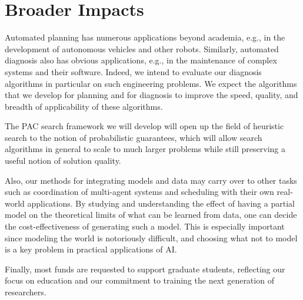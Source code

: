 \documentclass[12pt]{article}
\begin{document}


\section{Broader Impacts}
Automated planning has numerous applications beyond academia, e.g., in the development of autonomous vehicles and other robots. Similarly, automated diagnosis also has obvious applications, e.g., in the maintenance of complex systems and their software. Indeed, we intend to evaluate our diagnosis algorithms in particular on such engineering problems. %
We expect the algorithms that we develop for planning and for diagnosis to improve the speed, quality, and breadth of applicability of these algorithms. 

The PAC search framework we will develop will open up the field of heuristic search to the notion of probabilistic guarantees, which will allow search algorithms in general to scale to much larger problems while still preserving a useful notion of solution quality. 

Also, our methods for integrating models and data may carry over to other tasks such as coordination of multi-agent systems and scheduling with their own real-world applications. By studying and understanding the effect of having a partial model on the theoretical limits of what can be learned from data, one can decide the cost-effectiveness of generating such a model. 
This is especially important since modeling the world is notoriously difficult, and choosing what not to model is a key problem in practical applications of AI. 

Finally, most funds are requested to support graduate students, reflecting our focus on education and our commitment to training the next generation of researchers. 
\end{document}
